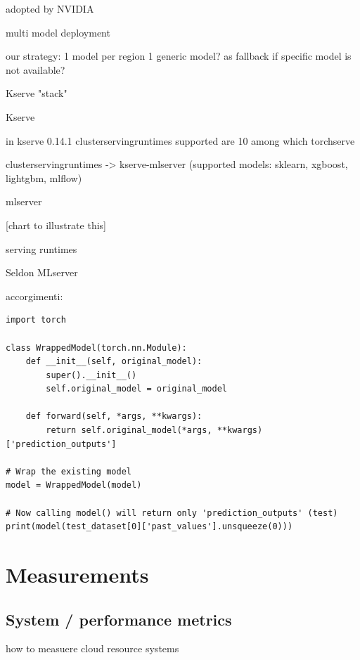adopted by NVIDIA



multi model deployment



our strategy:
1 model per region
1 generic model? as fallback if specific model is not available?




Kserve "stack"

Kserve

in kserve 0.14.1
clusterservingruntimes
supported are 10
among which 
torchserve

clusterservingruntimes -> kserve-mlserver (supported models: sklearn, xgboost, lightgbm, mlflow)

mlserver

[chart to illustrate this]







serving runtimes

Seldon MLserver


accorgimenti: \\

\lstset{style=python}
\begin{lstlisting}[caption={Wrapping a PyTorch Model}, label={lst:wrapped_model}]
import torch

class WrappedModel(torch.nn.Module):
    def __init__(self, original_model):
        super().__init__()
        self.original_model = original_model

    def forward(self, *args, **kwargs):
        return self.original_model(*args, **kwargs)['prediction_outputs']

# Wrap the existing model
model = WrappedModel(model)

# Now calling model() will return only 'prediction_outputs' (test)
print(model(test_dataset[0]['past_values'].unsqueeze(0)))
\end{lstlisting}

\section{Measurements}


\subsection{System / performance metrics}


how to measuere cloud resource systems


